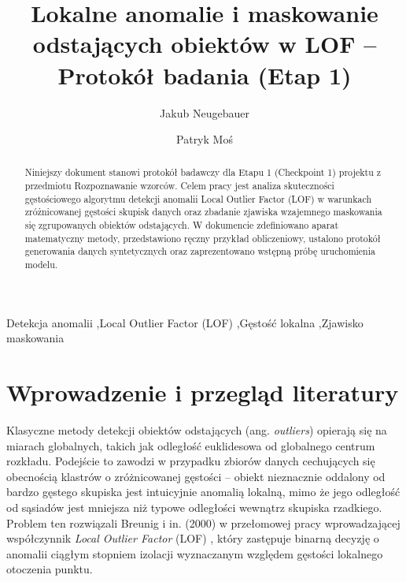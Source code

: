 \documentclass[a4paper,fleqn]{cas-sc}
\begin{document}
\let\WriteBookmarks\relax
\def\floatpagepagefraction{1}
\def\textpagefraction{.001}


\title [mode = title]{Lokalne anomalie i maskowanie odstających obiektów w LOF -- Protokół badania (Etap 1)}

\author[1]{Jakub Neugebauer}

\author[1]{Patryk Moś}


\begin{abstract}
Niniejszy dokument stanowi protokół badawczy dla Etapu 1 (Checkpoint 1) projektu z przedmiotu Rozpoznawanie wzorców. Celem pracy jest analiza skuteczności gęstościowego algorytmu detekcji anomalii Local Outlier Factor (LOF) w warunkach zróżnicowanej gęstości skupisk danych oraz zbadanie zjawiska wzajemnego maskowania się zgrupowanych obiektów odstających. W dokumencie zdefiniowano aparat matematyczny metody, przedstawiono ręczny przykład obliczeniowy, ustalono protokół generowania danych syntetycznych oraz zaprezentowano wstępną próbę uruchomienia modelu.
\end{abstract}

\begin{keywords}
Detekcja anomalii \sep Local Outlier Factor (LOF) \sep Gęstość lokalna \sep Zjawisko maskowania
\end{keywords}

\maketitle

\section{Wprowadzenie i przegląd literatury}
Klasyczne metody detekcji obiektów odstających (ang. \textit{outliers}) opierają się na miarach globalnych, takich jak odległość euklidesowa od globalnego centrum rozkładu. Podejście to zawodzi w przypadku zbiorów danych cechujących się obecnością klastrów o zróżnicowanej gęstości -- obiekt nieznacznie oddalony od bardzo gęstego skupiska jest intuicyjnie anomalią lokalną, mimo że jego odległość od sąsiadów jest mniejsza niż typowe odległości wewnątrz skupiska rzadkiego. Problem ten rozwiązali Breunig i in. (2000) w przełomowej pracy wprowadzającej współczynnik \textit{Local Outlier Factor} (LOF) \cite{breunig2000lof}, który zastępuje binarną decyzję o anomalii ciągłym stopniem izolacji wyznaczanym względem gęstości lokalnego otoczenia punktu.
\end{document}
